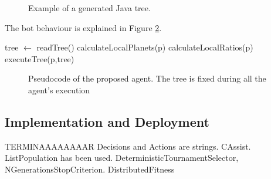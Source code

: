 \begin{figure} 
\usebox{\javaboxrts}
\caption{Example of a generated Java tree.}
\label{fig:java}
\end{figure}

The bot behaviour is explained in Figure \ref{alg:turn}.

\newsavebox{\algoartsbox}
\begin{lrbox}{\algoartsbox}
\begin{minipage}{10cm}
\begin{algorithmic}
\STATE tree $\gets$ readTree()
    \STATE calculateLocalPlanets(p)%
    \STATE calculateLocalRatios(p)%
    \STATE executeTree(p,tree)%
  \ENDFOR

\ENDWHILE
\end{algorithmic}
\end{minipage}
\end{lrbox}

\begin{figure}
\usebox{\algoartsbox}
\caption{Pseudocode of the proposed agent. The tree is fixed during all the agent's execution}
\label{alg:turn}
\end{figure}






	

\subsection{Implementation and Deployment}
TERMINAAAAAAAAR
Decisions and Actions are strings. CAssist. ListPopulation has been used. DeterministicTournamentSelector, NGenerationsStopCriterion. DistributedFitness



